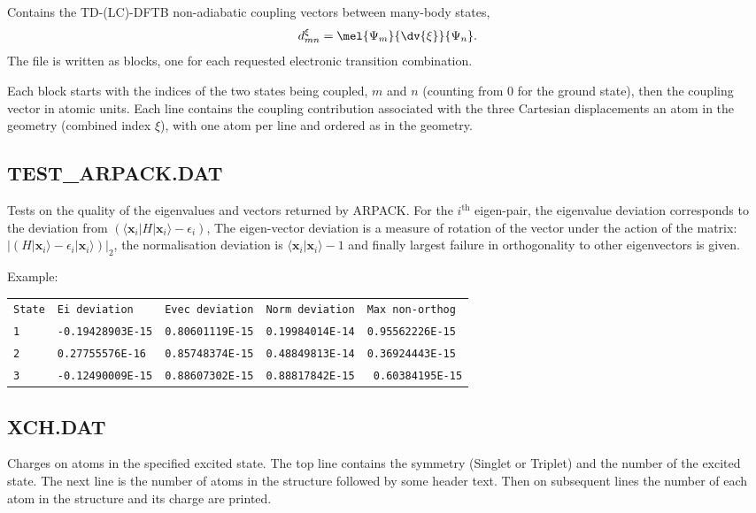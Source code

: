 Contains the TD-(LC)-DFTB non-adiabatic coupling vectors between
many-body states, $$d^\xi_{mn} = \mel{\Psi_m}{\dv{\xi}}{\Psi_n}.$$
The file is written as blocks, one for each requested electronic
transition combination.

Each block starts with the indices of the two states being coupled,
$m$ and $n$ (counting from 0 for the ground state), then the coupling
vector in atomic units. Each line contains the coupling contribution
associated with the three Cartesian displacements an atom in the
geometry (combined index $\xi$), with one atom per line and ordered as
in the geometry.

\subsection{TEST\_ARPACK.DAT}

Tests on the quality of the eigenvalues and vectors returned by ARPACK. For the
$i^\mathrm{th}$ eigen-pair, the eigenvalue deviation corresponds to the
deviation from $\left( \langle \mathbf{x}_i | H | \mathbf{x}_i\rangle -
\epsilon_i \right)$, The eigen-vector deviation is a measure of rotation of the
vector under the action of the matrix: $\left| \left( H | \mathbf{x}_i\rangle -
\epsilon_i | \mathbf{x}_i\rangle \right) \right|_2$, the normalisation deviation
is $\langle \mathbf{x}_i | \mathbf{x}_i\rangle - 1$ and finally largest failure
in orthogonality to other eigenvectors is given.

Example:\\
\begin{tabular}{lllll}
{\tt State} & {\tt Ei deviation} & {\tt Evec deviation} & {\tt Norm deviation} &
{\tt Max non-orthog}\\ {\tt 1} & {\tt -0.19428903E-15} & {\tt 0.80601119E-15} &
{\tt 0.19984014E-14} & {\tt 0.95562226E-15}\\ {\tt 2} & {\tt 0.27755576E-16} &
{\tt 0.85748374E-15} & {\tt 0.48849813E-14} & {\tt 0.36924443E-15}\\ {\tt 3} &
{\tt -0.12490009E-15} & {\tt 0.88607302E-15} & {\tt 0.88817842E-15} & {\tt
  0.60384195E-15}\\
\end{tabular}

\subsection{XCH.DAT}

Charges on atoms in the specified excited state. The top line contains the
symmetry (Singlet or Triplet) and the number of the excited state. The next line
is the number of atoms in the structure followed by some header text. Then on
subsequent lines the number of each atom in the structure and its charge are
printed.

